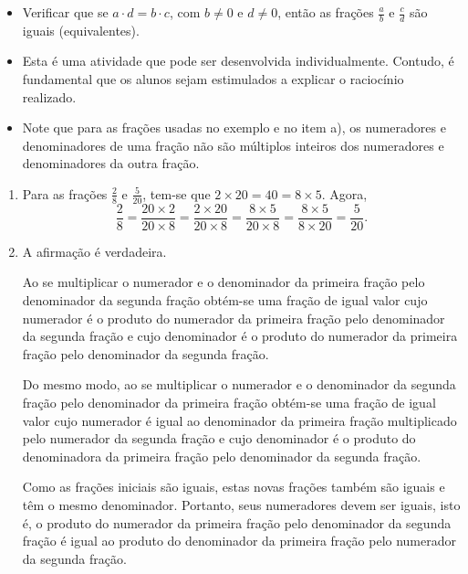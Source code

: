 \begin{atividade}\label{chap4-ativ19}
\objetivos
\begin{itemize} %
    \item       Verificar que se       $a \cdot d = b \cdot c$, com       $b
\not = 0$       e       $d \not = 0$, então as frações       $\frac{a}{b}$
e       $\frac{c}{d}$       são iguais (equivalentes).
\end{itemize} %

\discussoes
\begin{itemize} %
    \item       Esta é uma atividade que pode ser desenvolvida individualmente.
Contudo, é fundamental que os alunos sejam estimulados a explicar o raciocínio
realizado.
    \item       Note que para as frações usadas no exemplo e no item a), os
numeradores e denominadores de uma fração não são múltiplos inteiros dos
numeradores e denominadores da outra fração.
\end{itemize} %

\solucao
\begin{enumerate} %
    \item       Para as frações       $\frac{2}{8}$       e
$\frac{5}{20}$, tem-se que        $2 \times 20 = 40 = 8 \times 5$. Agora,
$$\frac{2}{8} = \frac{20 \times 2}{20 \times 8} = \frac{2 \times 20}{20 \times
8} = \frac{8 \times 5}{20 \times 8} = \frac{8 \times 5}{8 \times 20} =
\frac{5}{20}.$$
    \item       A afirmação é verdadeira.

  Ao se multiplicar o numerador e o denominador da primeira fração pelo
denominador da segunda fração obtém-se uma fração de igual valor cujo numerador
é o produto do numerador da primeira fração pelo denominador da segunda fração e
cujo denominador é o produto do numerador da primeira fração pelo denominador da
segunda fração.

  Do mesmo modo, ao se multiplicar o numerador e o denominador da segunda fração
pelo denominador da primeira fração obtém-se uma fração de igual valor cujo
numerador é igual ao denominador da primeira fração multiplicado pelo numerador
da segunda fração e cujo denominador é o produto do denominadora da primeira
fração pelo denominador da segunda fração.

  Como as frações iniciais são iguais, estas novas frações também são iguais e
têm o mesmo denominador. Portanto, seus numeradores devem ser iguais, isto é, o
produto do numerador da primeira fração pelo denominador da segunda fração é
igual ao produto do denominador da primeira fração pelo numerador da segunda
fração.
\end{enumerate} %
\end{atividade}

